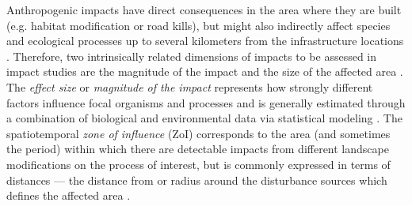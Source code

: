 \documentclass[titlepage]{article}
\begin{document}
Anthropogenic impacts have direct consequences in the area where they are built (e.g. habitat modification or road kills), but might also indirectly affect species and ecological processes up to several kilometers from the infrastructure locations \citep[e.g. reducing the probability of animal occurrence][]{johnson_cumulative_2005,torres_assessing_2016}. Therefore, two intrinsically related dimensions of impacts to be assessed in impact studies are the magnitude of the impact and the size of the affected area \citep[Box 1; ][]{naugle_unifying_2011}. The \textit{effect size} or \textit{magnitude of the impact} represents how strongly different factors influence focal organisms and processes and is generally estimated through a combination of biological and environmental data via statistical modeling \citep[Box 1;][]{polfus_identifying_2011}. The spatiotemporal \textit{zone of influence} (ZoI) 
corresponds to the area (and sometimes the period) within which there are detectable impacts from different landscape modifications on the process of interest, but is commonly expressed in terms of distances --- the distance from or radius around the disturbance sources which defines the affected area \citep[Box 1;][]{ boulanger_estimating_2012}. 
\end{document}
